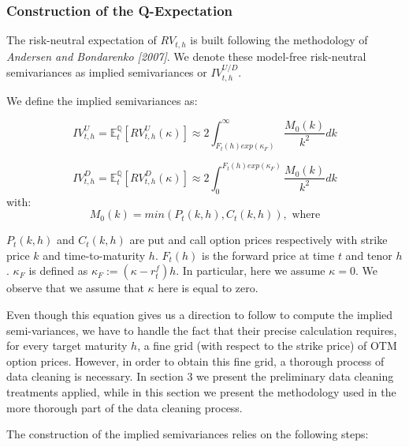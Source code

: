 \subsubsection{Construction of the Q-Expectation}
The risk-neutral expectation of $RV_{t,h}$ is built following the methodology of \textit{Andersen and Bondarenko [2007]}. We denote these model-free risk-neutral semivariances as implied semivariances or $IV_{t,h}^{U/D}$. 

We define the implied semivariances as:

\begin{equation} \label{eq:IV def1}
IV_{t,h}^{U} = \mathbb{E}_{t}^{\mathbb{Q}} \left[ RV_{t,h}^{U} (\kappa) \right] \approx 2 \int_{F_{t}(h)exp(\kappa_{F})}^{\infty} \frac{M_{0}(k)}{k^{2}} dk
\end{equation}

\begin{equation} \label{eq:IV def2}
IV_{t,h}^{D} = \mathbb{E}_{t}^{\mathbb{Q}} \left[ RV_{t,h}^{D} (\kappa) \right] \approx 2 \int_{0}^{F_{t}(h)exp(\kappa_{F})} \frac{M_{0}(k)}{k^{2}}  dk
\end{equation}
with:
\begin{equation}
M_{0}(k) = min(P_{t}(k,h), C_{t}(k,h)), \text{ where}
\end{equation}

$P_{t}(k,h)$ and $C_{t}(k,h)$ are put and call option prices respectively with strike price $k$ and time-to-maturity $h$. $F_{t}(h)$ is the forward price at time $t$ and tenor $h$. $\kappa_{F}$ is defined as $\kappa_{F}:=(\kappa - r_{t}^{f})h$. In particular, here we assume $\kappa=0$. We observe that we assume that $\kappa$ here is equal to zero.


\vspace{4mm}
Even though this equation gives us a direction to follow to compute the implied semi-variances, we have to handle the fact that their precise calculation requires, for every target maturity $h$, a fine grid (with respect to the strike price) of OTM option prices. However, in order to obtain this fine grid, a thorough process of data cleaning is necessary. In section 3 we present the preliminary data cleaning treatments applied, while in this section we present the methodology used in the more thorough part of the data cleaning process. 

\vspace{4mm}
The construction of the implied semivariances relies on the following steps:
